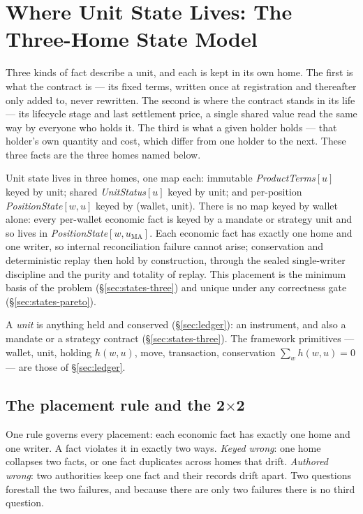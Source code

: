 \documentclass[11pt,a4paper]{article}
\begin{document}
\section{Where Unit State Lives: The Three-Home State Model}
\label{sec:states}

Three kinds of fact describe a unit, and each is kept in its own home. The first is what
the contract is --- its fixed terms, written once at registration and thereafter only added
to, never rewritten. The second is where the contract stands in its life --- its lifecycle
stage and last settlement price, a single shared value read the same way by everyone who
holds it. The third is what a given holder holds --- that holder's own quantity and cost,
which differ from one holder to the next. These three facts are the three homes named
below.

Unit state lives in three homes, one map each: immutable \emph{ProductTerms}$[u]$
keyed by unit; shared \emph{UnitStatus}$[u]$ keyed by unit; and per-position
\emph{PositionState}$[w,u]$ keyed by (wallet, unit). There is no map keyed by wallet
alone: every per-wallet economic fact is keyed by a mandate or strategy unit and so
lives in \emph{PositionState}$[w,u_{\mathrm{MA}}]$. Each economic fact has exactly one
home and one writer, so internal reconciliation failure cannot arise; conservation and
deterministic replay then hold by construction, through the sealed single-writer
discipline and the purity and totality of replay. This placement is the minimum basis of
the problem (\S\ref{sec:states-three}) and unique under any correctness gate
(\S\ref{sec:states-pareto}).

A \emph{unit} is anything held and conserved (\S\ref{sec:ledger}): an instrument, and
also a mandate or a strategy contract (\S\ref{sec:states-three}). The framework
primitives --- wallet, unit, holding $h(w,u)$, move, transaction, conservation
$\sum_{w}h(w,u)=0$ --- are those of \S\ref{sec:ledger}.

\subsection{The placement rule and the 2\texorpdfstring{$\times$}{x}2}
\label{sec:states-rule}

One rule governs every placement: each economic fact has exactly one home and one
writer. A fact violates it in exactly two ways. \emph{Keyed wrong}: one home collapses
two facts, or one fact duplicates across homes that drift. \emph{Authored wrong}: two
authorities keep one fact and their records drift apart. Two questions forestall the two
failures, and because there are only two failures there is no third question.
\end{document}

